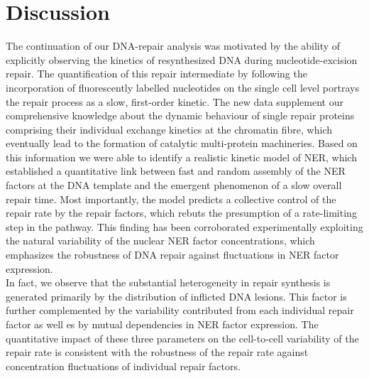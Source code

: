 \chapter{Discussion}


The continuation of our DNA-repair analysis was motivated by the ability of explicitly observing the kinetics of resynthesized DNA during nucleotide-excision repair. The quantification of this repair intermediate by following the incorporation of fluorescently labelled nucleotides on the single cell level portrays the repair process as a slow, first-order kinetic. The new data supplement our comprehensive knowledge about the dynamic behaviour of single repair proteins comprising their individual exchange kinetics at the chromatin fibre, which eventually lead to the formation of catalytic multi-protein machineries. Based on this information we were able to identify a realistic kinetic model of NER, which established a quantitative link between fast and random assembly of the NER factors at the DNA template and the emergent phenomenon of a slow overall repair time. Most importantly, the model predicts a collective control of the repair rate by the repair factors, which rebuts the presumption of a rate-limiting step in the pathway. This finding has been corroborated experimentally exploiting the natural variability of the nuclear NER factor concentrations, which emphasizes the robustness of DNA repair against fluctuations in NER factor expression.\\       
In fact, we observe that the substantial heterogeneity in repair synthesis is generated primarily by the distribution of inflicted DNA lesions. This factor is further complemented by the variability contributed from each individual repair factor as well es by mutual dependencies in NER factor expression. The quantitative impact of these three parameters on the cell-to-cell variability of the repair rate is consistent with the robustness of the repair rate against concentration fluctuations of individual repair factors.


